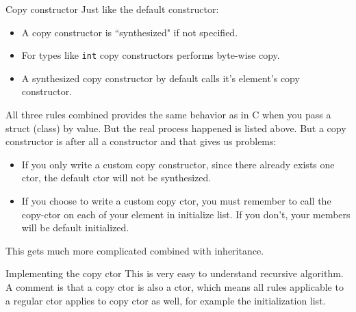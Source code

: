 \begin{frame}[fragile]{Copy constructor}
Just like the default constructor:
\begin{itemize}
	\item A copy constructor is ``synthesized" if not specified.
	\item For types like \texttt{int} copy constructors performs byte-wise copy.
	\item A synthesized copy constructor by default calls it's element's copy constructor.
\end{itemize}
All three rules combined provides the same behavior as in C when you pass a struct (class) by value. But the real process happened is listed above. But a copy constructor is after all a constructor and that gives us problems:
\begin{itemize}
	\small
	\item If you only write a custom copy constructor, since there already exists one ctor, the default ctor will not be synthesized.
	\item If you choose to write a custom copy ctor, you must remember to call the copy-ctor on each of your element in initialize list. If you don't, your members will be default initialized.
\end{itemize}
This gets much more complicated combined with inheritance. 
\end{frame}

\begin{frame}{Implementing the copy ctor}
This is very easy to understand recursive algorithm. A comment is that a copy ctor is also a ctor, which means all rules applicable to a regular ctor applies to copy ctor as well, for example the initialization list. 
 	
\inputminted[fontsize=\small,firstline=32,lastline=41]{c++}{code/Linked-List/IntList.cpp}
\end{frame}

